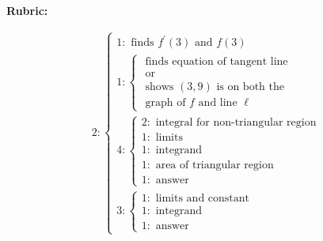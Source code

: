 \documentclass[12pt,addpoints,answers]{exam}
\begin{document}
\begin{questions}
\begin{solution}
\par\medskip
\textbf{Rubric:}\par
\[\begin{aligned}
& 2:\left\{\begin{array}{c}
1: \text { finds } f^{\prime}(3) \text { and } f(3) \\
1:\left\{\begin{array}{c}
\text { finds equation of tangent line } \\
\text { or } \\
\text { shows }(3,9) \text { is on both the } \\
\text { graph of } f \text { and line } \ell
\end{array}\right. \\
4:\left\{\begin{array}{c}
2: \text { integral for non-triangular region } \\
1: \text { limits } \\
1: \text { integrand } \\
1: \text { area of triangular region } \\
1: \text { answer }
\end{array}\right. \\
3:\left\{\begin{array}{l}
1: \text { limits and constant } \\
1: \text { integrand } \\
1: \text { answer }
\end{array}\right.
\end{array}\right.
\end{aligned}\]
\end{solution}


\end{questions}
\end{document}
